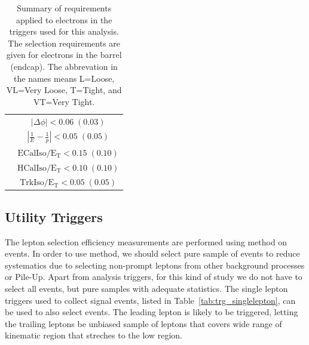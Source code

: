 \begin{table}[!ht]
\begin{tabular}{l|c}
                               	& $|\Delta\phi|\mathrm{< 0.06\;(0.03)}$  \\
                               	& $|\frac{1}{E}-\frac{1}{p}|\mathrm{< 0.05\;(0.05)}$  \\
    							& $\mathrm{ECalIso/E_T <0.15\;(0.10)}$ \\
                                & $\mathrm{HCalIso/E_T <0.10\;(0.10)}$ \\
                       			& $\mathrm{TrkIso/E_T <0.05\;(0.05)}$\\
    \hline
 \end{tabular}
 \caption{Summary of requirements applied to electrons in the triggers used for this analysis.
The selection requirements are given for electrons in the barrel (endcap).
The abbrevation in the names means L=Loose, VL=Very Loose, T=Tight, and VT=Very Tight.}
 \label{tab:trg_requirement_def}
\end{table}

\subsection{Utility Triggers}

The lepton selection efficiency measurements are performed using \tnp{} method
on \dyll{} events. In order to use \tnp{} method, we should select pure sample 
of \dyll{} events to reduce systematics due to selecting non-prompt leptons from 
other background processes or Pile-Up. Apart from analysis triggers, for this 
kind of study we do not have to select all events, but pure samples with 
adequate statistics. The single lepton triggers used to collect signal events, 
listed in Table~\ref{tab:trg_singlelepton}, can be used to also select 
\dyll{} events. The leading lepton is likely to be triggered, letting the 
trailing leptons be unbiased sample of leptons that covers wide range of 
kinematic region that streches to the low \pt region.   


